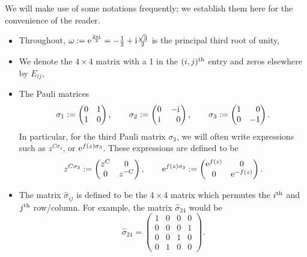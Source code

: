 \documentclass[pdftex]{sigma}
\numberwithin{equation}{section}
\begin{document}
We will make use of some notations frequently; we establish them here for the convenience of the reader.
 \begin{itemize}\itemsep=0pt
 \item Throughout, $\omega := {\rm e}^{\frac{2\pi {\rm i}}{3}} = -\frac{1}{2} + {\rm i}\frac{\sqrt{3}}{2}$ is the principal third root of unity,
 \item We denote the $4\times 4$ matrix with a 1 in the $(i,j)^{\rm th}$ entry and zeros elsewhere by $E_{ij}$,
 \item The Pauli matrices
 \begin{equation*}
 \sigma_{1} := \begin{pmatrix} 0 & 1\\ 1 & 0\end{pmatrix}, \qquad
 \sigma_{2} := \begin{pmatrix} 0 & -{\rm i}\\ {\rm i} & \hphantom{-} 0\end{pmatrix},\qquad
 \sigma_{3} := \begin{pmatrix} 1 & \hphantom{-} 0\\ 0 & -1 \end{pmatrix}.
 \end{equation*}
 In particular, for the third Pauli matrix $\sigma_3$, we will often write expressions such as $z^{C \sigma_3}$, or ${\rm e}^{f(z)\sigma_3}$. These expressions are defined to be
 \begin{equation*}
 z^{C \sigma_3} := \begin{pmatrix}
 z^{C} & 0\\
 0 & z^{-C}
 \end{pmatrix},\qquad
 {\rm e}^{f(z)\sigma_3} :=
 \begin{pmatrix}
 {\rm e}^{f(z)} & 0\\
 0 & {\rm e}^{-f(z)}
 \end{pmatrix}.
 \end{equation*}
 \item The matrix $\hat{\sigma}_{ij}$ is defined to be the $4\times 4$ matrix which permutes the $i^{\rm th}$ and $j^{\rm th}$ row/column. For example, the matrix $\hat{\sigma}_{24}$ would be
 \begin{equation*}
 \hat{\sigma}_{24} =
 \begin{pmatrix}
 1 & 0 & 0 & 0\\
 0 & 0 & 0 & 1\\
 0 & 0 & 1 & 0\\
 0 & 1 & 0 & 0
 \end{pmatrix}.

\end{equation*}
\end{itemize}
\end{document}
